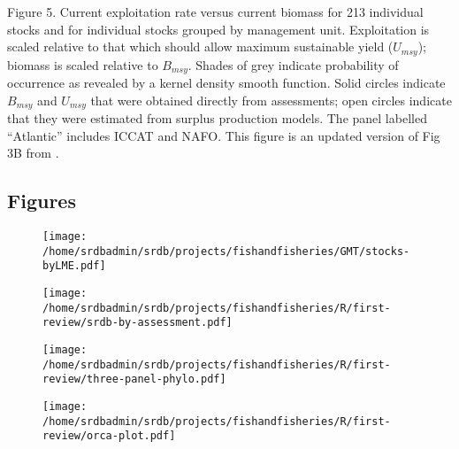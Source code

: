 \noindent Figure 5. Current exploitation rate versus current biomass
for 213 individual stocks and for individual stocks grouped by
management unit. Exploitation is scaled relative to that which should
allow maximum sustainable yield ($U_{msy}$); biomass is scaled
relative to $B_{msy}$. Shades of grey indicate probability of
occurrence as revealed by a kernel density smooth function. Solid
circles indicate $B_{msy}$ and $U_{msy}$ that were obtained directly
from assessments; open circles indicate that they were estimated from
surplus production models. The panel labelled ``Atlantic'' includes
ICCAT and NAFO. This figure is an updated version of Fig 3B from
\citet{Worm:etal:2009:science}.
\\

\newpage
\subsection*{Figures}

\begin{landscape}
\begin{figure}
\begin{center}
\texttt{[image: /home/srdbadmin/srdb/projects/fishandfisheries/GMT/stocks-byLME.pdf]}
\end{center}
\caption{ }\label{fig:lmes}
\end{figure}
\end{landscape}


\begin{figure}
\begin{center}
\texttt{[image: /home/srdbadmin/srdb/projects/fishandfisheries/R/first-review/srdb-by-assessment.pdf]} %
\end{center}
\caption{ }\label{fig:taxo:srdb}
\end{figure}

\begin{figure}
\begin{center}
\texttt{[image: /home/srdbadmin/srdb/projects/fishandfisheries/R/first-review/three-panel-phylo.pdf]} %
\end{center}
\caption{ }\label{fig:taxo:threepanel}
\end{figure}



\begin{landscape}
\begin{figure}
\begin{center}
\texttt{[image: /home/srdbadmin/srdb/projects/fishandfisheries/R/first-review/orca-plot.pdf]}
\end{center}
\caption{ }\label{fig:orca}
\end{figure}
\end{landscape}

